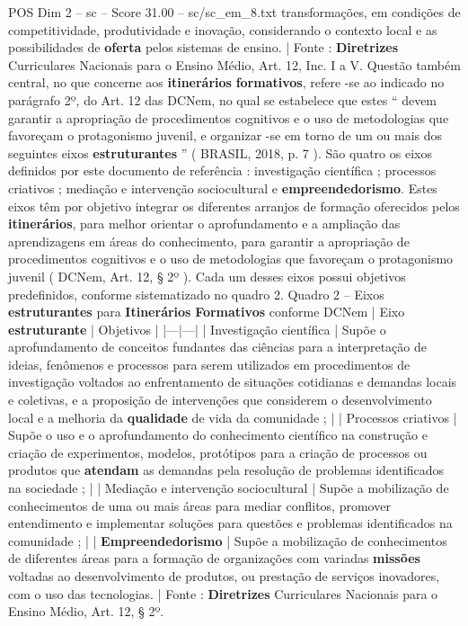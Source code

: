 \begin{textsample}{POS Dim 2 – sc – Score 31.00 – sc/sc\_em\_8.txt}
transformações, em condições de competitividade, produtividade e inovação, considerando o contexto local e as possibilidades de \textbf{oferta} pelos sistemas de ensino. | Fonte : \textbf{Diretrizes} Curriculares Nacionais para o Ensino Médio, Art. 12, Inc.
I a V.
Questão também central, no que concerne aos \textbf{itinerários} \textbf{formativos}, refere -se ao indicado no parágrafo 2º, do Art. 12 das DCNem, no qual se estabelece que estes “ devem garantir a apropriação de procedimentos cognitivos e o uso de metodologias que favoreçam o protagonismo juvenil, e organizar -se em torno de um ou mais dos seguintes eixos \textbf{estruturantes} ” ( BRASIL, 2018, p. 7 ).
São quatro os eixos definidos por este documento de referência : investigação científica ; processos criativos ; mediação e intervenção sociocultural e \textbf{empreendedorismo}.
Estes eixos têm por objetivo integrar os diferentes arranjos de formação oferecidos pelos \textbf{itinerários}, para melhor orientar o aprofundamento e a ampliação das aprendizagens em áreas do conhecimento, para garantir a apropriação de procedimentos cognitivos e o uso de metodologias que favoreçam o protagonismo juvenil ( DCNem, Art. 12, § 2º ).
Cada um desses eixos possui objetivos predefinidos, conforme sistematizado no quadro 2.
Quadro 2 – Eixos \textbf{estruturantes} para \textbf{Itinerários} \textbf{Formativos} conforme DCNem | Eixo \textbf{estruturante} | Objetivos | |---|---| | Investigação científica | Supõe o aprofundamento de conceitos fundantes das ciências para a interpretação de ideias, fenômenos e processos para serem utilizados em procedimentos de investigação voltados ao enfrentamento de situações cotidianas e demandas locais e coletivas, e a proposição de intervenções que considerem o desenvolvimento local e a melhoria da \textbf{qualidade} de vida da comunidade ; | | Processos criativos | Supõe o uso e o aprofundamento do conhecimento científico na construção e criação de experimentos, modelos, protótipos para a criação de processos ou produtos que \textbf{atendam} as demandas pela resolução de problemas identificados na sociedade ; | | Mediação e intervenção sociocultural | Supõe a mobilização de conhecimentos de uma ou mais áreas para mediar conflitos, promover entendimento e implementar soluções para questões e problemas identificados na comunidade ; | | \textbf{Empreendedorismo} | Supõe a mobilização de conhecimentos de diferentes áreas para a formação de organizações com variadas \textbf{missões} voltadas ao desenvolvimento de produtos, ou prestação de serviços inovadores, com o uso das tecnologias. | Fonte : \textbf{Diretrizes} Curriculares Nacionais para o Ensino Médio, Art. 12, § 2º.

\end{textsample}
